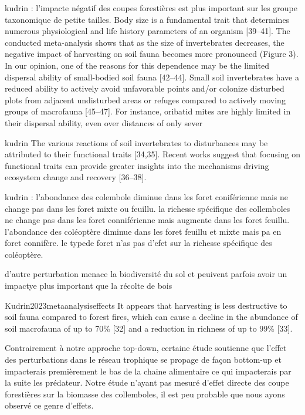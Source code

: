 
kudrin : 
l'impacte négatif des coupes forestières est plus important sur les groupe taxonomique de petite tailles.
Body size is a fundamental trait that determines numerous physiological and life history parameters of an organism [39–41]. The conducted meta-analysis shows that as the size of invertebrates decreases, the negative impact of harvesting on soil fauna becomes more pronounced (Figure 3). In our opinion, one of the reasons for this dependence may be the limited dispersal ability of small-bodied soil fauna [42–44]. Small soil invertebrates have a reduced ability to actively avoid unfavorable points and/or colonize disturbed plots from adjacent undisturbed areas or refuges compared to actively moving groups of macrofauna [45–47]. For instance, oribatid mites are highly limited in their dispersal ability, even over distances of only sever


kudrin The various reactions of soil invertebrates to disturbances may be attributed to their functional traits [34,35]. Recent works suggest that focusing on functional traits can provide greater insights into the mechanisms driving ecosystem change and recovery [36–38].



kudrin :
 l'abondance des colembole diminue dans les foret coniférienne mais ne change pas dans les foret mixte ou feuillu.
 la richesse spécifique des collemboles  ne change pas dans les foret conniférienne mais augmente dans les foret feuillu.
 l'abondance des coléoptère diminue dans les foret feuillu et mixte mais pa en foret connifère.
 le typede foret n'as pas d'efet sur la richesse spécifique des coléoptère.


d'autre perturbation menace la biodiversité du sol et peuivent parfois avoir un impactye plus important que la récolte de bois

 Kudrin2023metaanalysiseffects
 It appears that harvesting is less destructive to soil fauna compared to forest fires, which can cause a decline in the abundance of soil macrofauna of up to 70\% [32] and a reduction in richness of up to 99\% [33].


Contrairement à notre approche top-down, certaine étude soutienne que l'effet des perturbations dans le réseau trophique se propage de façon bottom-up et impacterais premièrement le bas de la chaine alimentaire ce qui impacterais par la suite les prédateur.
Notre étude n'ayant pas mesuré d'effet directe des coupe forestières sur la biomasse des collemboles, il est peu probable que nous ayons observé ce genre d'effets. 

